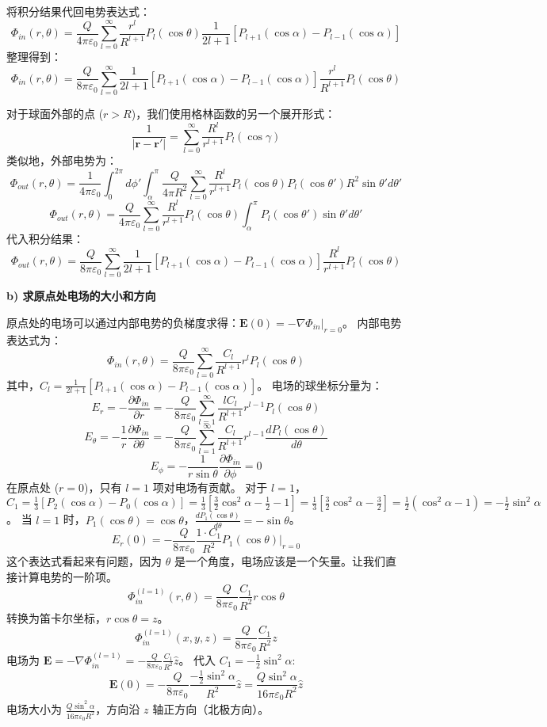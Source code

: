将积分结果代回电势表达式：
\[ \Phi_{in}(r, \theta) = \frac{Q}{4\pi \varepsilon_0} \sum_{l=0}^\infty \frac{r^l}{R^{l+1}} P_l(\cos\theta) \frac{1}{2l+1} [P_{l+1}(\cos\alpha) - P_{l-1}(\cos\alpha)] \]
整理得到：
\[ \Phi_{in}(r, \theta) = \frac{Q}{8\pi \varepsilon_0} \sum_{l=0}^\infty \frac{1}{2l+1} \left[ P_{l+1}(\cos\alpha) - P_{l-1}(\cos\alpha) \right] \frac{r^l}{R^{l+1}} P_l(\cos\theta) \]

对于球面外部的点 ($r > R$)，我们使用格林函数的另一个展开形式：
\[ \frac{1}{|\mathbf{r} - \mathbf{r}'|} = \sum_{l=0}^\infty \frac{R^l}{r^{l+1}} P_l(\cos\gamma) \]
类似地，外部电势为：
\[ \Phi_{out}(r, \theta) = \frac{1}{4\pi \varepsilon_0} \int_0^{2\pi} d\phi' \int_{\alpha}^{\pi} \frac{Q}{4\pi R^2} \sum_{l=0}^\infty \frac{R^l}{r^{l+1}} P_l(\cos\theta) P_l(\cos\theta') R^2 \sin\theta' d\theta' \]
\[ \Phi_{out}(r, \theta) = \frac{Q}{4\pi \varepsilon_0} \sum_{l=0}^\infty \frac{R^l}{r^{l+1}} P_l(\cos\theta) \int_{\alpha}^{\pi} P_l(\cos\theta') \sin\theta' d\theta' \]
代入积分结果：
\[ \Phi_{out}(r, \theta) = \frac{Q}{8\pi \varepsilon_0} \sum_{l=0}^\infty \frac{1}{2l+1} \left[ P_{l+1}(\cos\alpha) - P_{l-1}(\cos\alpha) \right] \frac{R^l}{r^{l+1}} P_l(\cos\theta) \]

\textbf{b) 求原点处电场的大小和方向}

原点处的电场可以通过内部电势的负梯度求得：$\mathbf{E}(0) = -\nabla \Phi_{in}|_{r=0}$。
内部电势表达式为：
\[ \Phi_{in}(r, \theta) = \frac{Q}{8\pi \varepsilon_0} \sum_{l=0}^\infty \frac{C_l}{R^{l+1}} r^l P_l(\cos\theta) \]
其中，$C_l = \frac{1}{2l+1} \left[ P_{l+1}(\cos\alpha) - P_{l-1}(\cos\alpha) \right]$。
电场的球坐标分量为：
\[ E_r = -\frac{\partial \Phi_{in}}{\partial r} = -\frac{Q}{8\pi \varepsilon_0} \sum_{l=1}^\infty \frac{l C_l}{R^{l+1}} r^{l-1} P_l(\cos\theta) \]
\[ E_\theta = -\frac{1}{r} \frac{\partial \Phi_{in}}{\partial \theta} = -\frac{Q}{8\pi \varepsilon_0} \sum_{l=1}^\infty \frac{C_l}{R^{l+1}} r^{l-1} \frac{d P_l(\cos\theta)}{d\theta} \]
\[ E_\phi = -\frac{1}{r \sin\theta} \frac{\partial \Phi_{in}}{\partial \phi} = 0 \]
在原点处 ($r=0$)，只有 $l=1$ 项对电场有贡献。
对于 $l=1$， $C_1 = \frac{1}{3} [P_2(\cos\alpha) - P_0(\cos\alpha)] = \frac{1}{3} \left[ \frac{3}{2}\cos^2\alpha - \frac{1}{2} - 1 \right] = \frac{1}{3} \left[ \frac{3}{2}\cos^2\alpha - \frac{3}{2} \right] = \frac{1}{2} (\cos^2\alpha - 1) = -\frac{1}{2} \sin^2\alpha$。
当 $l=1$ 时，$P_1(\cos\theta) = \cos\theta$，$\frac{d P_1(\cos\theta)}{d\theta} = -\sin\theta$。
\[ E_r(0) = -\frac{Q}{8\pi \varepsilon_0} \frac{1 \cdot C_1}{R^2} P_1(\cos\theta)|_{r=0} \]
这个表达式看起来有问题，因为 $\theta$ 是一个角度，电场应该是一个矢量。让我们直接计算电势的一阶项。
\[ \Phi_{in}^{(l=1)}(r, \theta) = \frac{Q}{8\pi \varepsilon_0} \frac{C_1}{R^2} r \cos\theta \]
转换为笛卡尔坐标，$r \cos\theta = z$。
\[ \Phi_{in}^{(l=1)}(x, y, z) = \frac{Q}{8\pi \varepsilon_0} \frac{C_1}{R^2} z \]
电场为 $\mathbf{E} = -\nabla \Phi_{in}^{(l=1)} = -\frac{Q}{8\pi \varepsilon_0} \frac{C_1}{R^2} \hat{z}$。
代入 $C_1 = -\frac{1}{2} \sin^2\alpha$:
\[ \mathbf{E}(0) = -\frac{Q}{8\pi \varepsilon_0} \frac{-\frac{1}{2} \sin^2\alpha}{R^2} \hat{z} = \frac{Q \sin^2\alpha}{16\pi \varepsilon_0 R^2} \hat{z} \]
电场大小为 $\frac{Q \sin^2\alpha}{16\pi \varepsilon_0 R^2}$，方向沿 $z$ 轴正方向（北极方向）。

